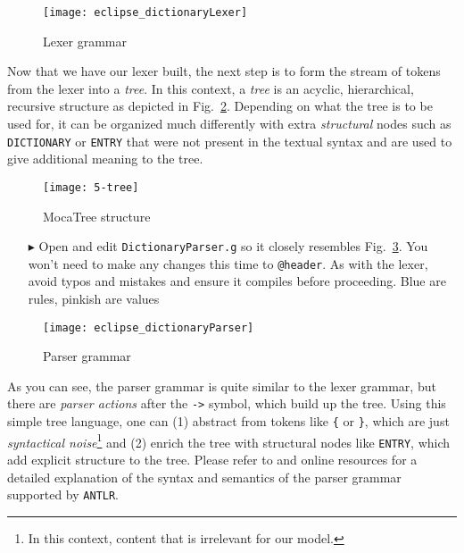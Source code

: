 \begin{figure}[!htbp]
\begin{center}
  \texttt{[image: eclipse\_dictionaryLexer]}
  \caption{Lexer grammar}
  \label{eclipse:dictionaryLexer}
\end{center}
\end{figure}

Now that we have our lexer built, the next step is to form the stream of tokens from the lexer into a \emph{tree}. In this context, a \emph{tree} is an acyclic,
hierarchical, recursive structure as depicted in Fig.~\ref{eclipse:dictLexer}. Depending on what the tree is to be used for, it can be organized much differently
with extra \emph{structural} nodes such as \texttt{DICTIONARY} or \texttt{ENTRY} that were not present in the textual syntax and are used to give additional
meaning to the tree.

\begin{figure}[htp]
\begin{center}
 \texttt{[image: 5-tree]}
  \caption{MocaTree structure}
  \label{eclipse:dictLexer}
\end{center}
\end{figure}

\begin{itemize}

\item[$\blacktriangleright$] Open and edit \texttt{DictionaryParser.g} so it closely resembles Fig.~\ref{eclipse:dictParser}. You won't need to make any changes
this time to \texttt{@header}. As with the lexer, avoid typos and mistakes and ensure it compiles before proceeding. Blue are rules, pinkish are values

\end{itemize}

\begin{figure}[!htbp]
\begin{center}
 \texttt{[image: eclipse\_dictionaryParser]}
  \caption{Parser grammar}
  \label{eclipse:dictParser}
\end{center}
\end{figure}

As you can see, the parser grammar is quite similar to the lexer grammar, but there are \emph{parser actions} after the \texttt{->} symbol, which build up the
tree. Using this simple tree language, one can (1) abstract from tokens like \texttt{\{} or \texttt{\}}, which are just \emph{syntactical noise}\footnote{In
this context, content that is irrelevant for our model.} and (2) enrich the tree with structural nodes like \texttt{ENTRY}, which add explicit structure to the
tree. Please refer to \cite{ANTLR} and online resources for a detailed explanation of the syntax and semantics of the parser grammar supported by
\texttt{ANTLR}.

